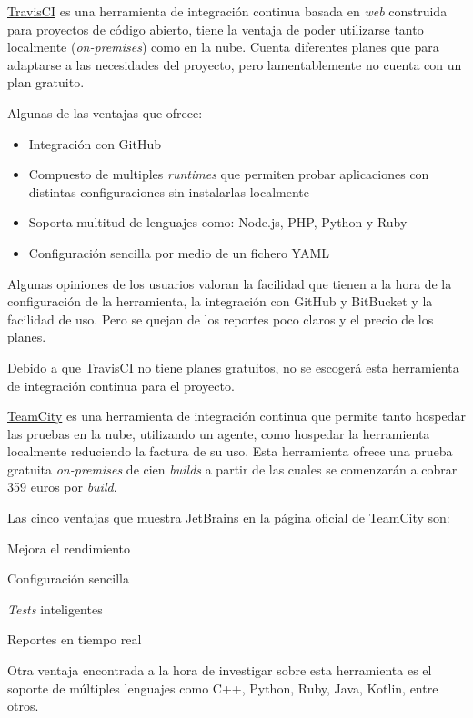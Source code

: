 \href{https://www.travis-ci.com/}{TravisCI} es una herramienta de integración continua basada en \emph{web} construida para proyectos de código abierto, tiene la ventaja de poder utilizarse tanto localmente (\emph{on-premises}) como en la nube. Cuenta diferentes planes que para adaptarse a las necesidades del proyecto, pero lamentablemente no cuenta con un plan gratuito. 

Algunas de las ventajas que ofrece:
\begin{itemize}
    \item Integración con GitHub
    \item Compuesto de multiples \emph{runtimes} que permiten probar aplicaciones con distintas configuraciones sin instalarlas localmente
    \item Soporta multitud de lenguajes como: Node.js, PHP, Python y Ruby
    \item Configuración sencilla por medio de un fichero YAML
\end{itemize}

Algunas opiniones de los usuarios valoran la facilidad que tienen a la hora de la configuración de la herramienta, la integración con GitHub y BitBucket y la facilidad de uso. Pero se quejan de los reportes poco claros y el precio de los planes. \cite{TravisCI2023}

Debido a que TravisCI no tiene planes gratuitos, no se escogerá esta herramienta de integración continua para el proyecto. 

\href{https://www.jetbrains.com/es-es/teamcity/}{TeamCity} es una herramienta de integración continua que permite tanto hospedar las pruebas en la nube, utilizando un agente, como hospedar la herramienta localmente reduciendo la factura de su uso. Esta herramienta ofrece una prueba gratuita \emph{on-premises} de cien \emph{builds} a partir de las cuales se comenzarán a cobrar 359 euros por \emph{build}.

Las cinco ventajas que muestra JetBrains en la página oficial de TeamCity son:
\begin{numerate}
    \item Mejora el rendimiento
    \item Configuración sencilla
    \item \emph{Tests} inteligentes
    \item Reportes en tiempo real
\end{numerate}

Otra ventaja encontrada a la hora de investigar sobre esta herramienta es el soporte de múltiples lenguajes como C++, Python, Ruby, Java, Kotlin, entre otros.

